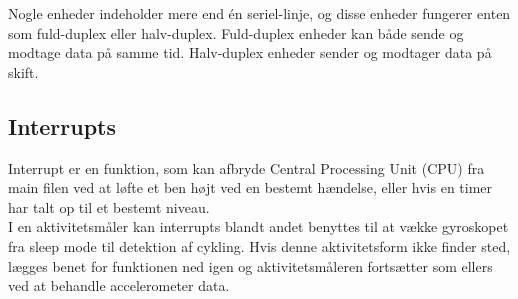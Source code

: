 Nogle enheder indeholder mere end én seriel-linje, og disse enheder fungerer enten som fuld-duplex eller halv-duplex. Fuld-duplex enheder kan både sende og modtage data på samme tid. Halv-duplex enheder sender og modtager data på skift. \citep{Jimb02016a,Chun-zhiYin-shuiLun-yao2011}

\subsection{Interrupts}
Interrupt er en funktion, som kan afbryde Central Processing Unit (CPU) fra main filen ved at løfte et ben højt ved en bestemt hændelse, eller hvis en timer har talt op til et bestemt niveau. \citep{Badiger2016} \\
I en aktivitetsmåler kan interrupts blandt andet benyttes til at vække gyroskopet fra sleep mode til detektion af cykling. Hvis denne aktivitetsform ikke finder sted, lægges benet for funktionen ned igen og aktivitetsmåleren fortsætter som ellers ved at behandle accelerometer data.

